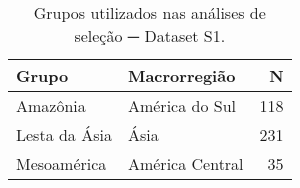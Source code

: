 \begin{table}[htb!]
\centering
\begin{tabular}[htb!]{llr}
\toprule
Grupo & Macrorregião & N\\
\midrule
Amazônia & América do Sul & 118\\
Lesta da Ásia & Ásia & 231\\
Mesoamérica & América Central & 35\\
\bottomrule
\end{tabular}

\caption{Grupos utilizados nas análises de seleção ─ Dataset S1.}
\label{tab:ds1_selgroups}

\end{table}
